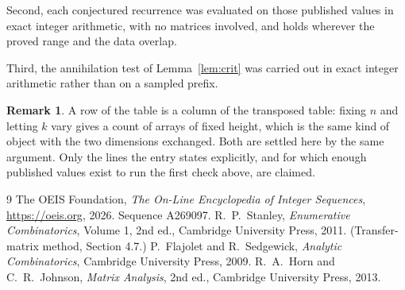 \documentclass[11pt,a4paper]{article}
\theoremstyle{plain}
\theoremstyle{definition}
\newtheorem{remark}[theorem]{Remark}
\begin{document}
Second, each conjectured recurrence was evaluated on those published values in exact
integer arithmetic, with no matrices involved, and holds wherever the proved range and the
data overlap.

Third, the annihilation test of Lemma~\ref{lem:crit} was carried out in exact integer
arithmetic rather than on a sampled prefix.

\begin{remark}
A row of the table is a column of the transposed table: fixing $n$ and letting $k$ vary gives a
count of arrays of fixed height, which is the same kind of object with the two dimensions
exchanged. Both are settled here by the same argument. Only the lines the entry states
explicitly, and for which enough published values exist to run the first check above, are
claimed.
\end{remark}

\begin{thebibliography}{9}
 The OEIS Foundation, \emph{The On-Line Encyclopedia of Integer
Sequences}, \url{https://oeis.org}, 2026. Sequence A269097.
 R.~P.~Stanley, \emph{Enumerative Combinatorics}, Volume 1, 2nd ed.,
Cambridge University Press, 2011. (Transfer-matrix method, Section 4.7.)
 P.~Flajolet and R.~Sedgewick, \emph{Analytic Combinatorics}, Cambridge
University Press, 2009.
 R.~A.~Horn and C.~R.~Johnson, \emph{Matrix Analysis}, 2nd ed., Cambridge
University Press, 2013.
\end{thebibliography}
\end{document}

